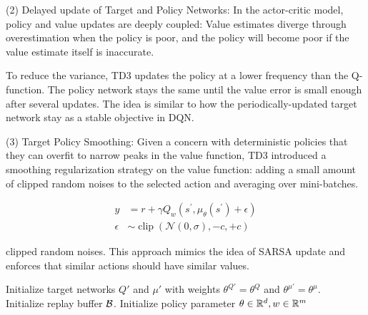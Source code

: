 \begin{refsection}
(2) Delayed update of Target and Policy Networks: In the actor-critic model, policy and value updates are deeply coupled: Value estimates diverge through overestimation when the policy is poor, and the policy will become poor if the value estimate itself is inaccurate.

To reduce the variance, TD3 updates the policy at a lower frequency than the Q-function. The policy network stays the same until the value error is small enough after several updates. The idea is similar to how the periodically-updated target network stay as a stable objective in DQN.

(3) Target Policy Smoothing: Given a concern with deterministic policies that they can overfit to narrow peaks in the value function, TD3 introduced a smoothing regularization strategy on the value function: adding a small amount of clipped random noises to the selected action and averaging over mini-batches.

\begin{align*}y&=r+\gamma Q_{w}\left(s^{\prime}, \mu_{\theta}\left(s^{\prime}\right)+\epsilon\right) \\ 
\epsilon &\sim \operatorname{clip}(\mathcal{N}(0, \sigma),-c,+c)
\end{align*}

clipped random noises.
This approach mimics the idea of SARSA update and enforces that similar actions should have similar values.


\begin{algorithm}
	Initialize target networks $Q'$ and $\mu'$ with weights $\theta^{Q'} = \theta^Q$ and $\theta^{\mu'} = \theta^\mu$. \\
	Initialize replay buffer $\mathcal{B}$.
	Initialize policy parameter $\theta\in \mathbb{R}^d, w\in \mathbb{R}^m$\\
\end{algorithm}
\end{refsection}
